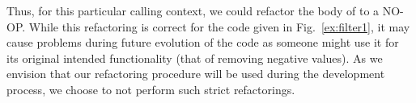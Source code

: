 \documentclass[runningheads,a4paper]{llncs}
\begin{document}
Thus, for this particular calling context, 
we could refactor the body of  to a NO-OP.
While this refactoring is correct for the code given in Fig.~\ref{ex:filter1}, 
it may cause problems during future evolution of the code 
as someone might use it for its original intended functionality 
(that of removing negative values). As we envision that our refactoring procedure 
will be used during the development process, we choose to not perform such 
strict refactorings.

\end{document}
